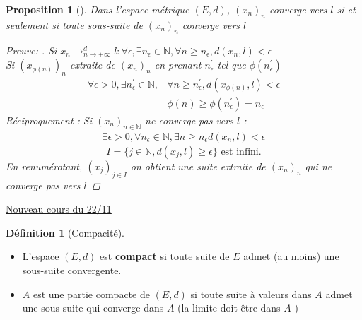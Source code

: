 \documentclass{article}
\theoremstyle{plain}%
\newtheorem{prop}[thm]{Proposition}
\theoremstyle{definition}
\newtheorem{defn}{Définition}[section]
\theoremstyle{remark}
\begin{document}
\begin{prop}[]
    Dans l'espace métrique $ (E,d) $, $ (x_n)_n $ converge vers $ l $ si et seulement si toute sous-suite de $ (x_n)_n $ converge vers $ l $ 

    \begin{proof}[Preuve: ]
        Si $ x_n \to _{n \to +\infty }^d l : \forall \epsilon, \exists n_\epsilon \in \mathbb{N}, \forall n \geq n_\epsilon, d(x_n, l) < \epsilon  $ \\
        Si $ (x_{\phi (n)})_n$ extraite de $ (x_n)_n $ en prenant $ n_\epsilon ^\prime  $ tel que $ \phi (n_\epsilon ^\prime ) $ 
        \begin{align*}
            \forall \epsilon > 0, \exists n_\epsilon ^\prime \in \mathbb{N}, &\forall n \geq n_\epsilon ^\prime, d(x_{\phi (n)}, l ) < \epsilon \\
                & \phi (n) \geq \phi (n_\epsilon ^\prime ) = n_\epsilon 
        \end{align*}
        Réciproquement : Si $ (x_n)_{n \in \mathbb{N}} $ ne converge pas vers $ l $ : 
        \begin{align*}
            \exists \epsilon > 0, \forall n_\epsilon \in \mathbb{N}, \exists n \geq  n_\epsilon d(x_n, l) < \epsilon 
        \end{align*}
        \[
            I = \{j \in \mathbb{N}, d(x_j,l) \geq \epsilon \} \text{ est infini}
        .\]
        En renumérotant, $ (x_j)_{j \in I} $ on obtient une suite extraite de $ (x_n)_n $ qui ne converge pas vers $ l $ 
    \end{proof}
\end{prop}

\underline{Nouveau cours du 22/11} \\

\begin{defn}[Compacité]
    \begin{itemize}
        \item L'espace $ (E,d) $ est \textbf{compact} si toute suite de $ E $ admet (au moins) une sous-suite convergente.
        \item $ A $ est une partie compacte de $ (E,d) $ si toute suite à valeurs dans $ A $ admet une sous-suite qui converge dans $ A $ (la limite doit être dans $ A $ )
    \end{itemize}
\end{defn}
\end{document}
